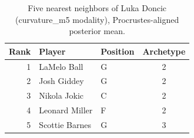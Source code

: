 \begin{table}[htbp]
  \centering\small
  \begin{tabular}{rllc}
    \toprule
    Rank & Player & Position & Archetype \\
    \midrule
    1 & LaMelo Ball & G & 2 \\
    2 & Josh Giddey & G & 2 \\
    3 & Nikola Jokic & C & 2 \\
    4 & Leonard Miller & F & 2 \\
    5 & Scottie Barnes & G & 3 \\
    \bottomrule
  \end{tabular}
  \caption{Five nearest neighbors of Luka Doncic (curvature_m5 modality), Procrustes-aligned posterior mean.}
  \label{tab:Luka_Doncic_neighbors_curvature_m5}
\end{table}

